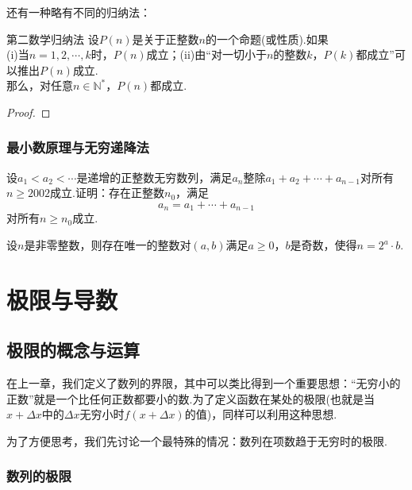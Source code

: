 \documentclass[lang=cn, zihao=5]{elegantbook}
\begin{document}
还有一种略有不同的归纳法：

\begin{theorem}{第二数学归纳法}
	设$P(n)$是关于正整数$n$的一个命题(或性质).如果 \\
	(i)当$n=1,2, \cdots ,k$时，$P(n)$成立；(ii)由“对一切小于$n$的整数$k$，$P(k)$都成立”可以推出$P(n)$成立. \\
	那么，对任意$n \in \mathbb{N}^{*}$，$P(n)$都成立.
\end{theorem}
\begin{proof}
\end{proof}

\subsection{最小数原理与无穷递降法}

\begin{example} %
	设$a_1<a_2<\cdots $是递增的正整数无穷数列，满足$a_n$整除$a_1+a_2+\cdots +a_{n-1}$对所有$n \geq 2002$成立.证明：存在正整数$n_0$，满足$$a_n=a_1+\cdots +a_{n-1}$$对所有$n \geq n_0$成立.
\end{example}

\begin{example}
	设$n$是非零整数，则存在唯一的整数对$(a,b)$满足$a \geq 0$，$b$是奇数，使得$n=2^a \cdot b$.
\end{example}

\chapter{极限与导数}

\section{极限的概念与运算}

在上一章，我们定义了数列的界限，其中可以类比得到一个重要思想：“无穷小的正数”就是一个比任何正数都要小的数.为了定义函数在某处的极限(也就是当$x+\Delta x$中的$\Delta x$无穷小时$f(x+\Delta x)$的值)，同样可以利用这种思想.

为了方便思考，我们先讨论一个最特殊的情况：数列在项数趋于无穷时的极限.

\subsection{数列的极限}
\end{document}
